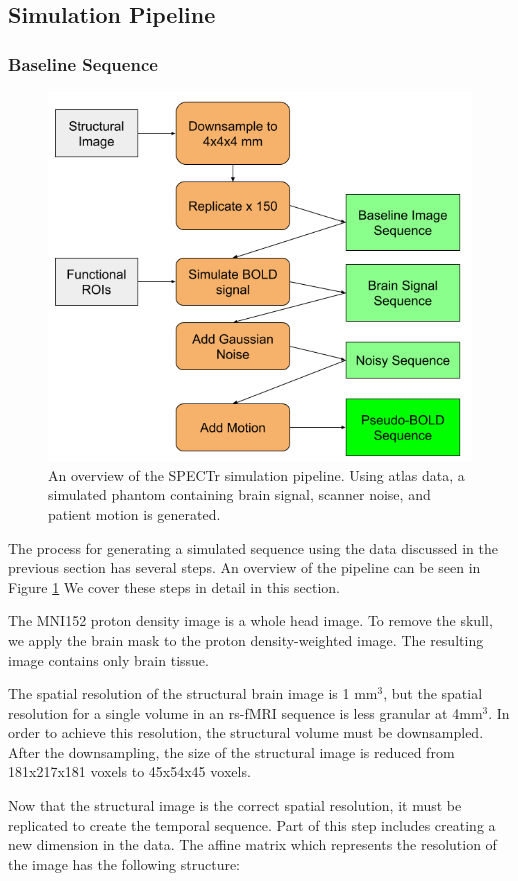 \subsection{Simulation Pipeline}

\subsubsection{Baseline Sequence}

\begin{figure}
\centering
\includegraphics[width=.6\textwidth]{5/pipeline.png}
\caption{An overview of the SPECTr simulation pipeline. Using atlas data, a simulated phantom containing brain signal, scanner noise, and patient motion is generated.}
\label{ch5:spectr_flow}
\end{figure}

The process for generating a simulated sequence using the data discussed in the previous section has several steps. An overview of the pipeline can be seen in Figure \ref{ch5:spectr_flow} We cover these steps in detail in this section.

The MNI152 proton density image is a whole head image. To remove the skull, we apply the brain mask to the proton density-weighted image. The resulting image contains only brain tissue.

The spatial resolution of the structural brain image is 1 mm$^3$, but the spatial resolution for a single volume in an rs-fMRI sequence is less granular at 4mm$^3$. In order to achieve this resolution, the structural volume must be downsampled. After the downsampling, the size of the structural image is reduced from 181x217x181 voxels to 45x54x45 voxels. 

Now that the structural image is the correct spatial resolution, it must be replicated to create the temporal sequence. Part of this step includes creating a new dimension in the data. The affine matrix which represents the resolution of the image has the following structure:

